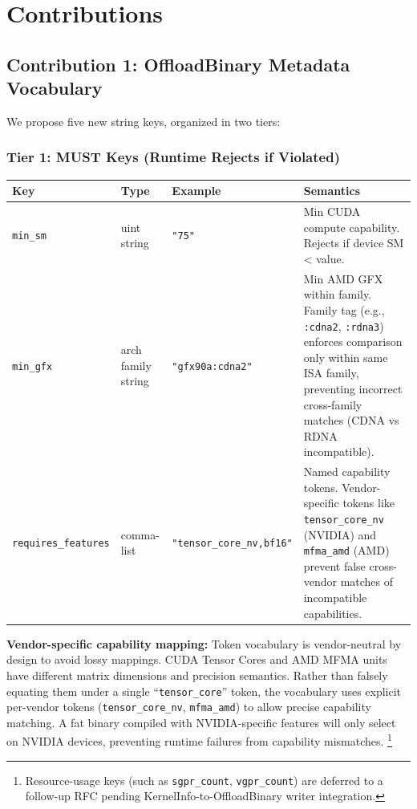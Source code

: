 \documentclass[11pt]{article}
\begin{document}
\section{Contributions}

\subsection{Contribution 1: OffloadBinary Metadata Vocabulary}

We propose five new string keys, organized in two tiers:

\subsubsection{Tier 1: MUST Keys (Runtime Rejects if Violated)}

\begin{center}
\begin{tabular}{llp{3cm}l}
  \toprule
  Key & Type & Example & Semantics \\
  \midrule
  \texttt{min\_sm} & uint string & \texttt{"75"} & Min CUDA compute capability. Rejects if device SM < value. \\
  \texttt{min\_gfx} & arch family string & \texttt{"gfx90a:cdna2"} & Min AMD GFX within family. Family tag (e.g., \texttt{:cdna2}, \texttt{:rdna3}) enforces comparison only within same ISA family, preventing incorrect cross-family matches (CDNA vs RDNA incompatible). \\
  \texttt{requires\_features} & comma-list & \texttt{"tensor\_core\_nv,bf16"} & Named capability tokens. Vendor-specific tokens like \texttt{tensor\_core\_nv} (NVIDIA) and \texttt{mfma\_amd} (AMD) prevent false cross-vendor matches of incompatible capabilities. \\
  \bottomrule
\end{tabular}
\end{center}

\textbf{Vendor-specific capability mapping:}
Token vocabulary is vendor-neutral by design to avoid lossy mappings.
CUDA Tensor Cores and AMD MFMA units have different matrix dimensions and precision semantics.
Rather than falsely equating them under a single ``\texttt{tensor\_core}'' token, the vocabulary uses explicit per-vendor tokens (\texttt{tensor\_core\_nv}, \texttt{mfma\_amd}) to allow precise capability matching.
A fat binary compiled with NVIDIA-specific features will only select on NVIDIA devices, preventing runtime failures from capability mismatches.%
\footnote{Resource-usage keys (such as \texttt{sgpr\_count}, \texttt{vgpr\_count}) are deferred to a follow-up RFC pending KernelInfo-to-OffloadBinary writer integration.}
\end{document}
